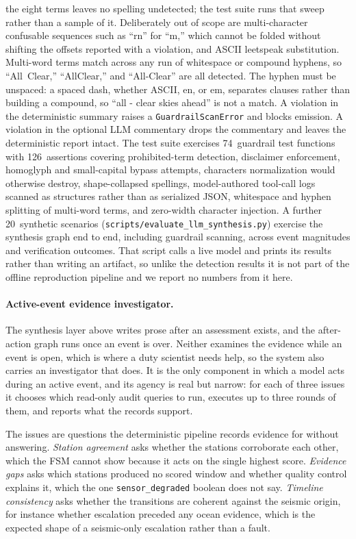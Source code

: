 \documentclass{article}
\begin{document}
the eight terms leaves no spelling undetected; the test suite runs
that sweep rather than a sample of it.  Deliberately out of scope
are multi-character confusable sequences such as ``rn'' for ``m,'' which
cannot be folded without shifting the offsets reported with a violation,
and ASCII leetspeak substitution.  Multi-word terms match across any run of whitespace or
compound hyphens, so ``All~Clear,'' ``AllClear,'' and ``All-Clear'' are
all detected.  The hyphen must be unspaced: a spaced dash, whether ASCII,
en, or em, separates clauses rather than building a compound, so
``all - clear skies ahead'' is not a match.
A violation in the deterministic summary raises a
\texttt{GuardrailScanError} and blocks emission. A violation in the
optional LLM commentary drops the commentary and leaves the
deterministic report intact.  The test suite exercises 74~guardrail test functions with
126~assertions covering prohibited-term detection, disclaimer
enforcement, homoglyph and small-capital bypass attempts, characters
normalization would otherwise destroy, shape-collapsed spellings,
model-authored tool-call logs scanned as structures rather than as
serialized JSON,
whitespace and hyphen splitting of multi-word terms, and zero-width
character injection.  A further 20~synthetic scenarios
(\texttt{scripts/evaluate\_llm\_synthesis.py}) exercise the synthesis
graph end to end, including guardrail scanning, across event
magnitudes and verification outcomes.  That script calls a live model
and prints its results rather than writing an artifact, so unlike the
detection results it is not part of the offline reproduction pipeline
and we report no numbers from it here.

\paragraph{Active-event evidence investigator.}
The synthesis layer above writes prose after an assessment exists, and the
after-action graph runs once an event is over.  Neither examines the evidence
while an event is open, which is where a duty scientist needs help, so the
system also carries an investigator that does.  It is the only component in
which a model acts during an active event, and its agency is real but narrow:
for each of three issues it chooses which read-only audit queries to run,
executes up to three rounds of them, and reports what the records support.

The issues are questions the deterministic pipeline records evidence for
without answering.  \emph{Station agreement} asks whether the stations
corroborate each other, which the FSM cannot show because it acts on the
single highest score.  \emph{Evidence gaps} asks which stations produced no
scored window and whether quality control explains it, which the one
\texttt{sensor\_degraded} boolean does not say.  \emph{Timeline consistency}
asks whether the transitions are coherent against the seismic origin, for
instance whether escalation preceded any ocean evidence, which is the expected
shape of a seismic-only escalation rather than a fault.
\end{document}
